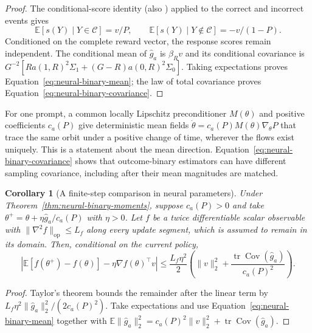\documentclass{article}
\newcommand{\enforcehalffinalproseline}{%
  \setlength{\parfillskip}{0pt plus .20\linewidth}}
\newcommand{\1}{\mathbf 1}
\newcommand{\E}{\mathbb E}
\newtheorem{corollary}[lemma]{Corollary}
\theoremstyle{remark}
\theoremstyle{definition}
\theoremstyle{plain}
\begin{document}
\begin{proof}
\enforcehalffinalproseline
The conditional-score identity
\citep[Theorem~1]{tajwar2026maxrl} (also
\citealp[Lemma~B.1]{avspo2026}) applied to the correct and incorrect events gives
\[
 \E[s(Y)\mid Y\in\mathcal C]=v/P,
 \qquad
 \E[s(Y)\mid Y\notin\mathcal C]=-v/(1-P).
\]
Conditioned on the complete reward vector, the response scores remain
independent. The conditional mean of $\widehat g_a$ is $\beta_Rv$ and
its conditional covariance is
$G^{-2}[R a(1,R)^2\Sigma_1+(G-R)a(0,R)^2\Sigma_0]$.
Taking expectations proves Equation~\eqref{eq:neural-binary-mean}; the law
of total covariance proves Equation~\eqref{eq:neural-binary-covariance}.
\end{proof}

For one prompt, a common locally Lipschitz preconditioner $M(\theta)$ and
positive coefficients $c_a(P)$ give deterministic mean fields
$\dot\theta=c_a(P)M(\theta)\nabla_\theta P$ that trace the same orbit
under a positive change of time, wherever the flows exist uniquely.
This is a statement about the mean direction. Equation~\eqref{eq:neural-binary-covariance}
shows that outcome-binary estimators can have different sampling covariance,
including after their mean magnitudes are matched.

\begin{corollary}[A finite-step comparison in neural parameters]
\enforcehalffinalproseline
\label{cor:neural-binary-finite-step}
Under Theorem~\ref{thm:neural-binary-moments}, suppose $c_a(P)>0$ and take
$\theta^+=\theta+\eta\widehat g_a/c_a(P)$ with $\eta>0$. Let $f$ be a
twice differentiable scalar observable with
$\|\nabla^2f\|_{\mathrm{op}}\le L_f$ along every update segment, which
is assumed to remain in its domain. Then, conditional on the current policy,
\begin{equation}
 \left|\E[f(\theta^+)-f(\theta)]
       -\eta\nabla f(\theta)^\top v\right|
 \le\frac{L_f\eta^2}{2}
 \left(\|v\|_2^2+
       \frac{\operatorname{tr}\operatorname{Cov}(\widehat g_a)}{c_a(P)^2}
 \right).
 \label{eq:neural-binary-finite-step}
\end{equation}
\end{corollary}

\begin{proof}
\enforcehalffinalproseline
Taylor's theorem bounds the remainder after the linear term by
$L_f\eta^2\|\widehat g_a\|_2^2/(2c_a(P)^2)$. Take expectations and use
Equation~\eqref{eq:neural-binary-mean} together with
$\E\|\widehat g_a\|_2^2
=c_a(P)^2\|v\|_2^2+\operatorname{tr}\operatorname{Cov}(\widehat g_a)$.
\end{proof}
\end{document}
